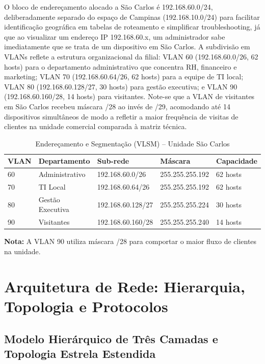 \documentclass[12pt,a4paper]{article}
\begin{document}
O bloco de endereçamento alocado a São Carlos é 192.168.60.0/24, deliberadamente separado do espaço de Campinas (192.168.10.0/24) para facilitar identificação geográfica em tabelas de roteamento e simplificar troubleshooting, já que ao visualizar um endereço IP 192.168.60.x, um administrador sabe imediatamente que se trata de um dispositivo em São Carlos. A subdivisão em VLANs reflete a estrutura organizacional da filial: VLAN 60 (192.168.60.0/26, 62 hosts) para o departamento administrativo que concentra RH, financeiro e marketing; VLAN 70 (192.168.60.64/26, 62 hosts) para a equipe de TI local; VLAN 80 (192.168.60.128/27, 30 hosts) para gestão executiva; e VLAN 90 (192.168.60.160/28, 14 hosts) para visitantes. Note-se que a VLAN de visitantes em São Carlos recebeu máscara /28 ao invés de /29, acomodando até 14 dispositivos simultâneos de modo a  refletir a maior frequência de visitas de clientes na unidade comercial comparada à matriz técnica.
\begin{table}[H]
\centering
\caption{Endereçamento e Segmentação (VLSM) -- Unidade São Carlos}
\label{tab:vlan_sao_carlos}
\begin{tabularx}{\textwidth}{@{}lllXl@{}}
\toprule
\textbf{VLAN} & \textbf{Departamento} & \textbf{Sub-rede} & \textbf{Máscara} & \textbf{Capacidade} \\ \midrule
60 & Administrativo & 192.168.60.0/26 & 255.255.255.192 & 62 hosts \\
70 & TI Local & 192.168.60.64/26 & 255.255.255.192 & 62 hosts \\
80 & Gestão Executiva & 192.168.60.128/27 & 255.255.255.224 & 30 hosts \\
90 & Visitantes & 192.168.60.160/28 & 255.255.255.240 & 14 hosts \\ \bottomrule
\end{tabularx}
\vspace{0.2cm}
\small{\textbf{Nota:} A VLAN 90 utiliza máscara /28 para comportar o maior fluxo de clientes na unidade.}
\end{table}


\section{Arquitetura de Rede: Hierarquia, Topologia e Protocolos}

\subsection{Modelo Hierárquico de Três Camadas e Topologia Estrela Estendida}
\end{document}
